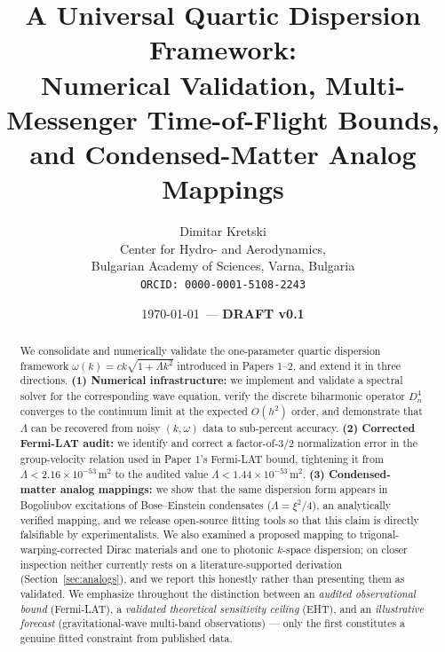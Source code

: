 \documentclass[12pt,a4paper]{article}
\begin{document}
\title{%
  A Universal Quartic Dispersion Framework:\\
  Numerical Validation, Multi-Messenger Time-of-Flight Bounds,\\
  and Condensed-Matter Analog Mappings
}
\author{%
  Dimitar Kretski\\
  Center for Hydro- and Aerodynamics,\\
  Bulgarian Academy of Sciences, Varna, Bulgaria\\
  \texttt{ORCID: 0000-0001-5108-2243}
}
\date{\today\ --- \textbf{DRAFT v0.1}}
\maketitle

\begin{abstract}
We consolidate and numerically validate the one-parameter quartic
dispersion framework $\omega(k)=ck\sqrt{1+\Lambda k^2}$ introduced in
Papers 1--2, and extend it in three directions.
\textbf{(1) Numerical infrastructure:} we implement and validate a
spectral solver for the corresponding wave equation, verify the
discrete biharmonic operator $D_n^4$ converges to the continuum limit
at the expected $O(h^2)$ order, and demonstrate that $\Lambda$ can be
recovered from noisy $(k,\omega)$ data to sub-percent accuracy.
\textbf{(2) Corrected Fermi-LAT audit:} we identify and correct a
factor-of-$3/2$ normalization error in the group-velocity relation
used in Paper 1's Fermi-LAT bound, tightening it from
$\Lambda<2.16\times10^{-53}\,\mathrm{m^2}$ to the audited value
$\Lambda<1.44\times10^{-53}\,\mathrm{m^2}$.
\textbf{(3) Condensed-matter analog mappings:} we show that the same
dispersion form appears in Bogoliubov excitations of Bose--Einstein
condensates ($\Lambda=\xi^2/4$), an analytically verified mapping, and
we release open-source fitting tools so that this claim is directly
falsifiable by experimentalists. We also examined a proposed mapping to
trigonal-warping-corrected Dirac materials and one to photonic
$k$-space dispersion; on closer inspection neither currently rests on a
literature-supported derivation (Section~\ref{sec:analogs}), and we
report this honestly rather than presenting them as validated.
We emphasize throughout the distinction between an \emph{audited
observational bound} (Fermi-LAT), a \emph{validated theoretical
sensitivity ceiling} (EHT), and an \emph{illustrative forecast}
(gravitational-wave multi-band observations) --- only the first
constitutes a genuine fitted constraint from published data.
\end{abstract}
\end{document}
